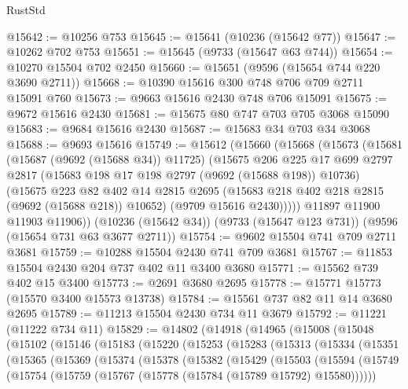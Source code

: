 \begin{lexlean}{RustStd}
\begin{coremodule}
{\begin{coremodule}
{{{{{{{{{{{{{{{{{{{{{{{{{{{{{{{{{{{{{{{{{{{{{{{{{{{{{{{@15642 := @10256 @753
@15645 := @15641 (@10236 (@15642 @77))
@15647 := @10262 @702 @753
@15651 := @15645 (@9733 (@15647 @63 @744))
@15654 := @10270 @15504 @702 @2450
@15660 := @15651 (@9596 (@15654 @744 @220 @3690 @2711))
@15668 := @10390 @15616 @300 @748 @706 @709 @2711 @15091 @760
@15673 := @9663 @15616 @2430 @748 @706 @15091
@15675 := @9672 @15616 @2430
@15681 := @15675 @80 @747 @703 @705 @3068 @15090
@15683 := @9684 @15616 @2430
@15687 := @15683 @34 @703 @34 @3068
@15688 := @9693 @15616
@15749 := @15612
    (@15660
      (@15668
        (@15673
          (@15681
            (@15687 (@9692 (@15688 @34)) @11725)
            (@15675
              @206
              @225
              @17
              @699
              @2797
              @2817
              (@15683 @198 @17 @198 @2797 (@9692 (@15688 @198)) @10736)
              (@15675
                @223
                @82
                @402
                @14
                @2815
                @2695
                (@15683 @218 @402 @218 @2815 (@9692 (@15688 @218)) @10652)
                (@9709 @15616 @2430)))))
        @11897
        @11900
        @11903
        @11906))
    (@10236 (@15642 @34))
    (@9733 (@15647 @123 @731))
    (@9596 (@15654 @731 @63 @3677 @2711))
@15754 := @9602 @15504 @741 @709 @2711 @3681
@15759 := @10288 @15504 @2430 @741 @709 @3681
@15767 := @11853 @15504 @2430 @204 @737 @402 @11 @3400 @3680
@15771 := @15562 @739 @402 @15 @3400
@15773 := @2691 @3680 @2695
@15778 := @15771 @15773 (@15570 @3400 @15573 @13738)
@15784 := @15561 @737 @82 @11 @14 @3680 @2695
@15789 := @11213 @15504 @2430 @734 @11 @3679
@15792 := @11221 (@11222 @734 @11)
@15829 := @14802
    (@14918
      (@14965
        (@15008
          (@15048
            (@15102
              (@15146
                (@15183
                  (@15220
                    (@15253
                      (@15283
                        (@15313
                          (@15334
                            (@15351
                              (@15365
                                (@15369
                                  (@15374
                                    (@15378
                                      (@15382
                                        (@15429
                                          (@15503
                                            (@15594
                                              (@15749
                                                (@15754
                                                  (@15759
                                                    (@15767
                                                      (@15778 (@15784 (@15789 @15792) @15580))))))
}}}}}}}}}}}}}}}}}}}}}}}}}}}}}}}}}}}}}}}}}}}}}}}}}}}}}}}
\end{coremodule}}
\end{coremodule}
\end{lexlean}
